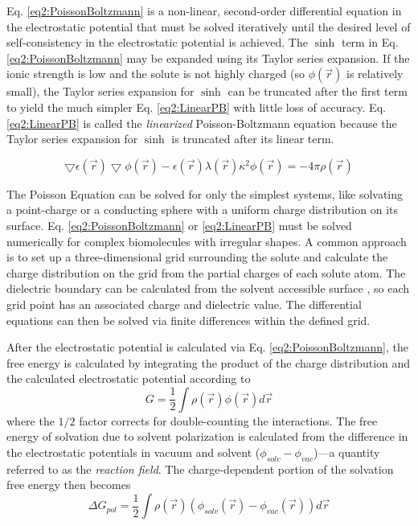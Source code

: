Eq. \ref{eq2:PoissonBoltzmann} is a non-linear, second-order differential
equation in the electrostatic potential that must be solved iteratively until
the desired level of self-consistency in the electrostatic potential is
achieved. The $\sinh$ term in Eq. \ref{eq2:PoissonBoltzmann} may be expanded
using its Taylor series expansion. If the ionic strength is low and the solute
is not highly charged (so $\phi(\vec{r})$ is relatively small), the Taylor
series expansion for $\sinh$ can be truncated after the first term to yield the
much simpler Eq. \ref{eq2:LinearPB} with little loss of accuracy. Eq.
\ref{eq2:LinearPB} is called the \emph{linearized} Poisson-Boltzmann equation
because the Taylor series expansion for $\sinh$ is truncated after its linear
term.

\begin{equation}
   \bigtriangledown \epsilon (\vec{r}) \bigtriangledown \phi(\vec{r}) -
         \epsilon(\vec{r}) \lambda(\vec{r}) \kappa ^ 2 \phi(\vec{r}) = -4 \pi
         \rho(\vec{r})
   \label{eq2:LinearPB}
\end{equation}

The Poisson Equation can be solved for only the simplest systems, like solvating
a point-charge or a conducting sphere with a uniform charge distribution on its
surface. Eq. \ref{eq2:PoissonBoltzmann} or \ref{eq2:LinearPB} must be solved
numerically for complex biomolecules with irregular shapes. A common approach is
to set up a three-dimensional grid surrounding the solute and calculate the
charge distribution on the grid from the partial charges of each solute atom.
The dielectric boundary can be calculated from the solvent accessible surface
\cite{Sitkoff_JPhysChem_1994_v98_p1978}, so each grid point has an associated
charge and dielectric value. The differential equations can then be solved via
finite differences within the defined grid. \cite{Klapper_Proteins_1986_v1_p47}

After the electrostatic potential is calculated via Eq.
\ref{eq2:PoissonBoltzmann}, the free energy is calculated by integrating the
product of the charge distribution and the calculated electrostatic potential
according to
\begin{equation*}
   G = \frac 1 2 \int \rho(\vec{r}) \phi(\vec{r}) d\vec{r}
\end{equation*}
where the $1/2$ factor corrects for double-counting the interactions.  The free
energy of solvation due to solvent polarization is calculated from the
difference in the electrostatic potentials in vacuum and solvent ($\phi_{solv} -
\phi_{vac}$)---a quantity referred to as the \emph{reaction field}.
\cite{Leach_Book_MolModel_2001} The charge-dependent portion of the solvation
free energy then becomes
\begin{equation}
   \Delta G _ {pol} = \frac 1 2 \int \rho(\vec{r}) \left ( \phi_{solv}(\vec{r})
      - \phi_{vac}(\vec{r}) \right ) d\vec{r}
   \label{eq2:ReactionField}
\end{equation}

